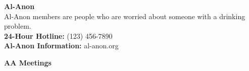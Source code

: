 \documentclass[11pt,twoside,letterpaper]{article}
\def\7pt{\fontsize{7}{8}\selectfont}
\def\8pt{\fontsize{8.5}{10}\selectfont}
\begin{document}
  \begin{minipage}[r][\dimexpr 0.485\textheight][t]{\dimexpr 0.485\textwidth}
    {\textbf{Al-Anon}}\hrulefill\\
{\7pt Al-Anon members are people who are worried about someone with a drinking problem.}\\
{\7pt\textbf{24-Hour Hotline:} (123) 456-7890}\\
{\7pt\textbf{Al-Anon Information:} al-anon.org}


  \end{minipage}

  \pagebreak


    {\textbf{AA Meetings}}\hrulefill
\end{document}
